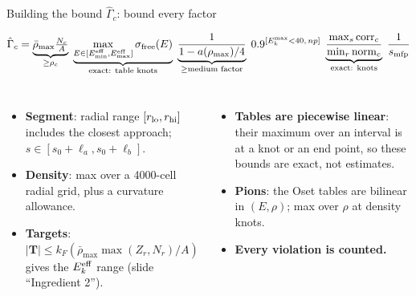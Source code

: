 \documentclass[10pt,aspectratio=169]{beamer}
\newcommand{\Gh}{\hat\Gamma}
\newcommand{\Ekeff}{E_k^{\rm eff}}
\begin{document}
\begin{frame}{Building the bound $\Gh_c$: bound every factor}
\begin{tcolorbox}[colback=bRed!4,colframe=bRed,boxrule=0.8pt]
\[
\Gh_c=\underbrace{\bar\rho_{\max}\tfrac{N_c}{A}}_{\ge\rho_c}\;
\underbrace{\max_{E\in[E^{\rm eff}_{\min},E^{\rm eff}_{\max}]}\sigma_{\rm free}(E)}_{\text{exact: table knots}}\;
\underbrace{\frac{1}{1-a(\rho_{\max})/4}}_{\ge\text{medium factor}}\;
0.9^{[E_k^{\max}<40,\,np]}\;
\underbrace{\frac{\max_s\mathrm{corr}_c}{\min_r\mathrm{norm}_c}}_{\text{exact: knots}}\;\frac{1}{s_{\rm mfp}}
\]
\end{tcolorbox}
\small
\begin{columns}[T]
\begin{itemize}
\item \textbf{Segment}: radial range $[r_{\rm lo},r_{\rm hi}]$ includes the closest approach; $s\in[s_0+\ell_a,s_0+\ell_b]$.
\item \textbf{Density}: max over a 4000-cell radial grid, plus a curvature allowance.
\item \textbf{Targets}: $|\mathbf T|\le k_F(\bar\rho_{\max}\max(Z_r,N_r)/A)$ gives the $\Ekeff$ range (slide ``Ingredient 2'').
\end{itemize}
\begin{itemize}
\item \textbf{Tables are piecewise linear}: their maximum over an interval is at a knot or an end point, so these bounds are exact, not estimates.
\item \textbf{Pions}: the Oset tables are bilinear in $(E,\rho)$; max over $\rho$ at density knots.
\item \textbf{Every violation is counted.}
\end{itemize}
\end{columns}
\end{frame}
\end{document}
